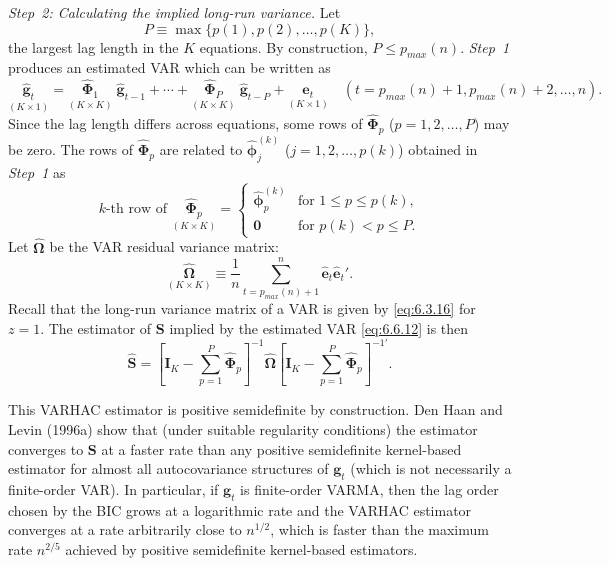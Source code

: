 \medskip
\noindent\emph{Step~2: Calculating the implied long-run variance.} \; Let
\[
  P \equiv \max\{p(1), p(2), \ldots, p(K)\},
\]
the largest lag length in the $K$ equations. By construction, $P \leq p_{max}(n)$.
\emph{Step~1} produces an estimated VAR which can be written as
\begin{equation}
  \underset{(K \times 1)}{\hat{\mathbf{g}}_t} =
  \underset{(K \times K)}{\hat{\bm{\Phi}}_1}\;\hat{\mathbf{g}}_{t-1}
  + \cdots +
  \underset{(K \times K)}{\hat{\bm{\Phi}}_P}\;\hat{\mathbf{g}}_{t-P}
  + \underset{(K \times 1)}{\hat{\mathbf{e}}_t}
  \quad (t = p_{max}(n) + 1, p_{max}(n) + 2, \ldots, n).
  \label{eq:6.6.12}
\end{equation}
Since the lag length differs across equations, some rows of $\hat{\bm{\Phi}}_p$ ($p =
1, 2, \ldots, P$) may be zero. The rows of $\hat{\bm{\Phi}}_p$ are related to $\hat{\bm{\phi}}_j^{(k)}$ ($j = 1, 2, \ldots,
p(k)$) obtained in \emph{Step~1} as
\begin{equation}
  k\text{-th row of } \underset{(K \times K)}{\hat{\bm{\Phi}}_p} =
  \begin{cases}
    \hat{\bm{\phi}}_p^{(k)} & \text{for } 1 \leq p \leq p(k), \\
    \mathbf{0} & \text{for } p(k) < p \leq P.
  \end{cases}
  \label{eq:6.6.13}
\end{equation}
Let $\hat{\bm{\Omega}}$ be the VAR residual variance matrix:
\begin{equation}
  \underset{(K \times K)}{\hat{\bm{\Omega}}} \equiv \frac{1}{n} \sum_{t=p_{max}(n)+1}^{n} \hat{\mathbf{e}}_t \hat{\mathbf{e}}_t'.
  \label{eq:6.6.14}
\end{equation}
Recall that the long-run variance matrix of a VAR is given by \eqref{eq:6.3.16} for
$z = 1$. The estimator of $\mathbf{S}$ implied by the estimated VAR \eqref{eq:6.6.12} is then
\begin{equation}
  \hat{\mathbf{S}} = \left[\mathbf{I}_K - \sum_{p=1}^{P} \hat{\bm{\Phi}}_p\right]^{-1}
  \hat{\bm{\Omega}}
  \left[\mathbf{I}_K - \sum_{p=1}^{P} \hat{\bm{\Phi}}_p\right]^{-1\prime}.
  \label{eq:6.6.15}
\end{equation}

This VARHAC estimator is positive semidefinite by construction. Den Haan
and Levin (1996a) show that (under suitable regularity conditions) the estimator
converges to $\mathbf{S}$ at a faster rate than any positive semidefinite kernel-based estimator
for almost all autocovariance structures of $\mathbf{g}_t$ (which is not necessarily a finite-order
VAR). In particular, if $\mathbf{g}_t$ is finite-order VARMA, then the lag order chosen by the
BIC grows at a logarithmic rate and the VARHAC estimator converges at a rate
arbitrarily close to $n^{1/2}$, which is faster than the maximum rate $n^{2/5}$ achieved by
positive semidefinite kernel-based estimators.

